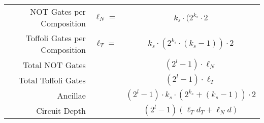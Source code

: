 \begin{table}
\begin{center}
\begin{tabular}{|r|cc|}
\hline
NOT Gates per Composition & $\ell_N = $ & $k_s \cdot (2^{k_s} \cdot 2$ \\
Toffoli Gates per Composition & $\ell_T = $ & $k_s \cdot (2^{k_s}\cdot (k_s-1)) \cdot 2$\\
Total NOT Gates & & $(2^l - 1) \cdot \ell_N$ \\
Total Toffoli Gates & & $(2^l - 1) \cdot \ell_T$ \\
Ancillae & & $(2^l - 1)\cdot k_s \cdot (2^{k_s} + (k_s - 1)) \cdot 2$\\
Circuit Depth & & $(2^l - 1)(\ell_T d_T + \ell_N d)$\\
\hline
\end{tabular}
\end{center}
\end{table}